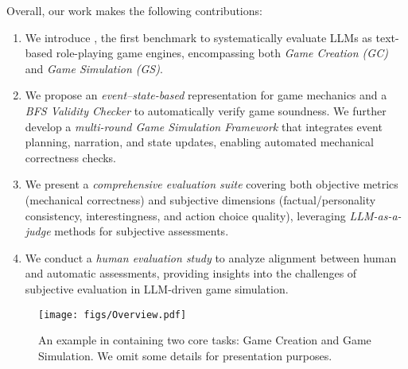 Overall, our work makes the following contributions:
\begin{enumerate}
    \item We introduce \benchmark{}, the first benchmark to systematically evaluate LLMs as text-based role-playing game engines, encompassing both \emph{Game Creation (GC)} and \emph{Game Simulation (GS)}.
    \item We propose an \emph{event–state-based} representation for game mechanics and a \emph{BFS Validity Checker} to automatically verify game soundness. We further develop a \emph{multi-round Game Simulation Framework} that integrates event planning, narration, and state updates, enabling automated mechanical correctness checks.
    \item We present a \emph{comprehensive evaluation suite} covering both objective metrics (mechanical correctness) and subjective dimensions (factual/personality consistency, interestingness, and action choice quality), leveraging \emph{LLM-as-a-judge} methods for subjective assessments.
    \item We conduct a \emph{human evaluation study} to analyze alignment between human and automatic assessments, providing insights into the challenges of subjective evaluation in LLM-driven game simulation.
\end{enumerate}


\begin{figure*}[!ht]
    \centering
    \texttt{[image: figs/Overview.pdf]}
    \caption{An example in \benchmark{} containing two core tasks: Game Creation and Game Simulation. We omit some details for presentation purposes.}
    \label{fig:rpebench-overview}
\end{figure*}